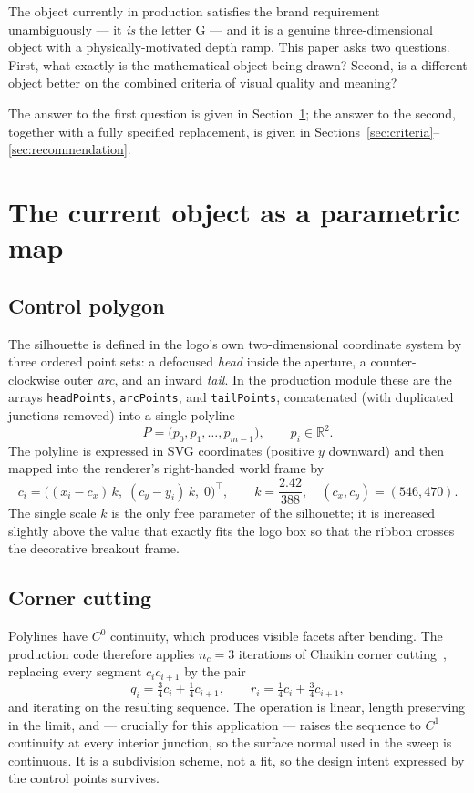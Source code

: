 \documentclass[11pt,a4paper]{article}
\theoremstyle{definition}
\begin{document}
The object currently in production satisfies the brand requirement
unambiguously --- it \emph{is} the letter G --- and it is a genuine
three-dimensional object with a physically-motivated depth ramp. This paper
asks two questions. First, what exactly is the mathematical object being
drawn? Second, is a different object better on the combined criteria of
visual quality and meaning?

The answer to the first question is given in Section~\ref{sec:current}; the
answer to the second, together with a fully specified replacement, is given in
Sections~\ref{sec:criteria}--\ref{sec:recommendation}.

\section{The current object as a parametric map}
\label{sec:current}

\subsection{Control polygon}

The silhouette is defined in the logo's own two-dimensional coordinate system
by three ordered point sets: a defocused \emph{head} inside the aperture, a
counter-clockwise outer \emph{arc}, and an inward \emph{tail}. In the
production module these are the arrays \texttt{headPoints},
\texttt{arcPoints}, and \texttt{tailPoints}, concatenated (with duplicated
junctions removed) into a single polyline
\[
P=\bigl(p_0,p_1,\dots,p_{m-1}\bigr),\qquad p_i\in\mathbb{R}^2 .
\]
The polyline is expressed in SVG coordinates (positive $y$ downward) and then
mapped into the renderer's right-handed world frame by
\begin{equation}
\label{eq:svg2world}
c_i=\bigl((x_i-c_x)\,k,\;(c_y-y_i)\,k,\;0\bigr)^{\!\top},
\qquad k=\frac{2.42}{388},\quad (c_x,c_y)=(546,470).
\end{equation}
The single scale $k$ is the only free parameter of the silhouette; it is
increased slightly above the value that exactly fits the logo box so that the
ribbon crosses the decorative breakout frame.

\subsection{Corner cutting}

Polylines have $C^0$ continuity, which produces visible facets after bending.
The production code therefore applies $n_c=3$ iterations of Chaikin corner
cutting~\cite{chaikin1975}, replacing every segment $c_i c_{i+1}$ by the pair
\begin{equation}
\label{eq:chaikin}
q_i=\tfrac34 c_i+\tfrac14 c_{i+1},
\qquad
r_i=\tfrac14 c_i+\tfrac34 c_{i+1},
\end{equation}
and iterating on the resulting sequence. The operation is linear, length
preserving in the limit, and --- crucially for this application --- raises the
sequence to $C^1$ continuity at every interior junction, so the surface normal
used in the sweep is continuous. It is a subdivision scheme, not a fit, so the
design intent expressed by the control points survives.
\end{document}
